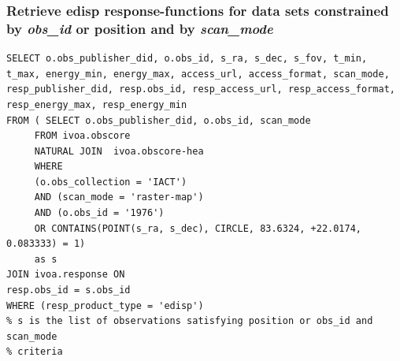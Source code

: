 \subsubsection*{Retrieve {\bf edisp} {\bf response-function}s for data sets constrained by {\em obs\_id} or position and by {\em scan\_mode}}
{\small
\begin{verbatim}
SELECT o.obs_publisher_did, o.obs_id, s_ra, s_dec, s_fov, t_min,
t_max, energy_min, energy_max, access_url, access_format, scan_mode,
resp_publisher_did, resp.obs_id, resp_access_url, resp_access_format,
resp_energy_max, resp_energy_min
FROM ( SELECT o.obs_publisher_did, o.obs_id, scan_mode
     FROM ivoa.obscore
     NATURAL JOIN  ivoa.obscore-hea
     WHERE
     (o.obs_collection = 'IACT')
     AND (scan_mode = 'raster-map')
     AND (o.obs_id = '1976')
     OR CONTAINS(POINT(s_ra, s_dec), CIRCLE, 83.6324, +22.0174, 0.083333) = 1)
     as s
JOIN ivoa.response ON
resp.obs_id = s.obs_id
WHERE (resp_product_type = 'edisp')
% s is the list of observations satisfying position or obs_id and scan_mode
% criteria
\end{verbatim}
}%



